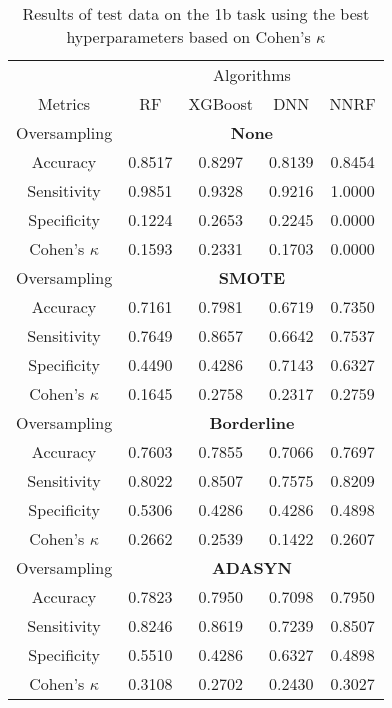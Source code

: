 \begin{table}[!htb]
\centering
\caption{Results of test data on the 1b task using the best hyperparameters based on Cohen's $\kappa$}
\label{tab:1b_test_results}
\begin{tabular}{c | c c c c}
\hline
 & \multicolumn{4}{c}{Algorithms}\\ 
Metrics &RF & XGBoost & DNN & NNRF\\ 
\hline
Oversampling &\multicolumn{4}{|c}{\textbf{None}}\\ 
\hline
Accuracy & 0.8517 & 0.8297 & 0.8139 & 0.8454\\ 
Sensitivity & 0.9851 & 0.9328 & 0.9216 & 1.0000\\ 
Specificity & 0.1224 & 0.2653 & 0.2245 & 0.0000\\ 
Cohen's $\kappa$ & 0.1593 & 0.2331 & 0.1703 & 0.0000\\ 
\hline
Oversampling &\multicolumn{4}{|c}{\textbf{SMOTE}}\\ 
\hline
Accuracy & 0.7161 & 0.7981 & 0.6719 & 0.7350\\ 
Sensitivity & 0.7649 & 0.8657 & 0.6642 & 0.7537\\ 
Specificity & 0.4490 & 0.4286 & 0.7143 & 0.6327\\ 
Cohen's $\kappa$ & 0.1645 & 0.2758 & 0.2317 & 0.2759\\ 
\hline
Oversampling &\multicolumn{4}{|c}{\textbf{Borderline}}\\ 
\hline
Accuracy & 0.7603 & 0.7855 & 0.7066 & 0.7697\\ 
Sensitivity & 0.8022 & 0.8507 & 0.7575 & 0.8209\\ 
Specificity & 0.5306 & 0.4286 & 0.4286 & 0.4898\\ 
Cohen's $\kappa$ & 0.2662 & 0.2539 & 0.1422 & 0.2607\\ 
\hline
Oversampling &\multicolumn{4}{|c}{\textbf{ADASYN}}\\ 
\hline
Accuracy & 0.7823 & 0.7950 & 0.7098 & 0.7950\\ 
Sensitivity & 0.8246 & 0.8619 & 0.7239 & 0.8507\\ 
Specificity & 0.5510 & 0.4286 & 0.6327 & 0.4898\\ 
Cohen's $\kappa$ & 0.3108 & 0.2702 & 0.2430 & 0.3027\\ 
\hline
\end{tabular}
\end{table}


